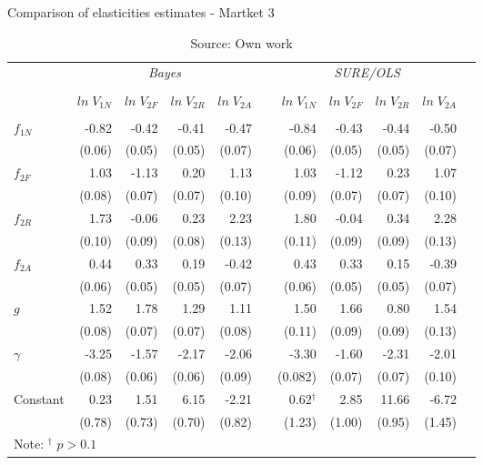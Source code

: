 \begin{table}
\caption{Comparison of elasticities estimates - Martket 3}
\label{tbl:mkt3_weak_SCOTYORK}
\centering
\begin{tabular}{lrrrrrrrrrr}
  \toprule 
 & \multicolumn{4}{c}{\textit{Bayes}} && \multicolumn{4}{c}{\textit{SURE/OLS}} \\ 
\cline{2-5} \cline{7-10} 
\\[-1.8ex] & $ln \; V_{1N}$ & $ln \; V_{2F}$ & $ln \; V_{2R}$ & $ln \; V_{2A}$ & & $ln \; V_{1N}$ & $ln \; V_{2F}$ & $ln \; V_{2R}$ & $ln \; V_{2A}$ \\ 
\hline \\[-1.8ex] 

$f_{1N}$ & -0.82  & \cellcolor{gray!25}-0.42  & \cellcolor{gray!25}-0.41  & \cellcolor{gray!25}-0.47   && -0.84 & \cellcolor{gray!25}-0.43 & \cellcolor{gray!25}-0.44 & \cellcolor{gray!25}-0.50 \\
         & (0.06) & (0.05) & (0.05) & (0.07)  && (0.06) & (0.05) & (0.05) & (0.07) \\ [0.2cm]
$f_{2F}$ & 1.03   & -1.13  & 0.20   & 1.13    && 1.03 & -1.12 & 0.23 & 1.07 \\
         & (0.08) & (0.07) & (0.07) & (0.10)  && (0.09) & (0.07) & (0.07) & (0.10) \\ [0.2cm]
$f_{2R}$ & 1.73   & \cellcolor{gray!25}-0.06  & \cellcolor{gray!25}0.23   & 2.23    && 1.80 & \cellcolor{gray!25}-0.04 & \cellcolor{gray!25}0.34 & 2.28 \\ 
         & (0.10) & (0.09) & (0.08) & (0.13)  && (0.11) & (0.09) & (0.09) & (0.13) \\ [0.2cm]
$f_{2A}$ & 0.44   & 0.33   & 0.19   & -0.42   && 0.43 & 0.33 & 0.15 & -0.39 \\
         & (0.06) & (0.05) & (0.05) & (0.07)  && (0.06) & (0.05) & (0.05) & (0.07) \\ [0.2cm]
$g$      & 1.52   & 1.78   & 1.29   & 1.11    && 1.50 & 1.66 & 0.80 & 1.54 \\ 
         & (0.08) & (0.07) & (0.07) & (0.08)  && (0.11) & (0.09) & (0.09) & (0.13) \\ [0.2cm]
$\gamma$ & -3.25  & -1.57  & -2.17  & -2.06   && -3.30 & -1.60 & -2.31 & -2.01 \\ 
         & (0.08) & (0.06) & (0.06) & (0.09)  && (0.082) & (0.07) & (0.07) & (0.10) \\ [0.2cm]
Constant & 0.23   & 1.51   & 6.15   &  -2.21  && 0.62$^{\dagger}$ & 2.85 & 11.66 & -6.72 \\ 
         & (0.78) & (0.73) & (0.70) & (0.82)  && (1.23) & (1.00) & (0.95) & (1.45) \\ [0.2cm]
\bottomrule
\multicolumn{3}{l}{Note: $^{\dagger}$ $p>0.1$}
\end{tabular}
\caption*{Source: Own work}
\end{table}

